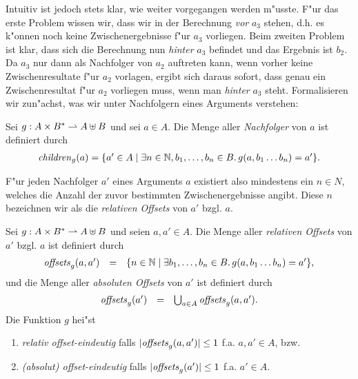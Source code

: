 \documentclass[12pt,a4paper]{article}
\begin{document}
Intuitiv ist jedoch stets klar, wie weiter vorgegangen werden m"usste. F"ur das erste Problem wissen wir,
dass wir in der Berechnung \emph{vor} $a_3$ stehen, d.h. es k"onnen noch keine Zwischenergebnisse f"ur $a_3$
vorliegen. Beim zweiten Problem ist klar, dass sich die Berechnung nun \emph{hinter} $a_3$ befindet und das
Ergebnis ist $b_2$. Da $a_3$ nur dann als Nachfolger von $a_2$ auftreten kann, wenn vorher keine
Zwischenresultate f"ur $a_2$ vorlagen, ergibt sich daraus sofort, dass genau ein Zwischenresultat f"ur $a_2$
vorliegen muss, wenn man \emph{hinter} $a_3$ steht. Formalisieren wir zun"achst, was wir unter Nachfolgern
eines Arguments verstehen:

\begin{definition}[Nachfolger]
  Sei $g: A \times B^* \rightharpoonup A \uplus B$ und sei $a \in A$. Die Menge aller \emph{Nachfolger} von $a$ ist
  definiert durch
  \[\begin{array}{rcl}
    \mathit{children}_g(a) = \{a' \in A \mid \exists n \in \mathbb N,b_1,\ldots,b_n \in B.\,g(a,b_1 \ldots b_n) = a'\}.
  \end{array}\]
\end{definition}

F"ur jeden Nachfolger $a'$ eines Arguments $a$ existiert also mindestens ein $n \in N$, welches die Anzahl
der zuvor bestimmten Zwischenergebnisse angibt. Diese $n$ bezeichnen wir als die \emph{relativen Offsets}
von $a'$ bzgl. $a$.

\begin{definition}
  Sei $g: A \times B^* \rightharpoonup A \uplus B$ und seien $a,a' \in A$. Die Menge aller \emph{relativen Offsets}
  von $a'$ bzgl. $a$ ist definiert durch
  \[\begin{array}{rcl}
    \mathit{offsets}_g(a,a') &=& \{n \in \mathbb N \mid \exists b_1,\ldots,b_n \in B.\, g(a,b_1 \ldots b_n) = a'\},
  \end{array}\]
  und die Menge aller \emph{absoluten Offsets} von $a'$ ist definiert durch
  \[\begin{array}{rcl}
    \mathit{offsets}_g(a') &=& \bigcup_{a \in A} \mathit{offsets}_g(a,a').
  \end{array}\]
  Die Funktion $g$ hei"st
  \begin{enumerate}
  \item \emph{relativ offset-eindeutig} falls $|\mathit{offsets}_g(a,a')| \le 1$ f.a. $a,a' \in A$, bzw.
  \item \emph{(absolut) offset-eindeutig} falls $|\mathit{offsets}_g(a')| \le 1$ f.a. $a' \in A$.
  \end{enumerate}
\end{definition}
\end{document}
